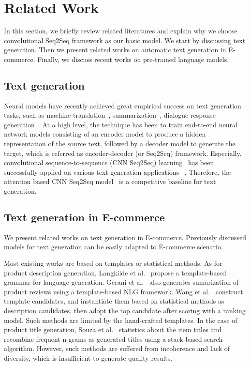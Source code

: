 \section{Related Work}
In this section, we briefly review related literatures
and explain why we choose convolutional Seq2Seq framework 
as our basic model.
We start by discussing text generation.
Then we present related works on automatic text generation in E-commerce.
Finally, we discuss recent works on
pre-trained language models.

\subsection{Text generation}
\label{sec:textgen}
Neural models have recently achieved great empirical success on text generation tasks,
such as machine translation~\cite{bahdanau2014neural,wu2016google},
summarization~\cite{chopra2016abstractive,nallapati2016abstractive},
dialogue response generation~\cite{serban2017multiresolution}.
At a high level, the technique has been to train end-to-end neural network models
consisting of an encoder model to produce a hidden representation of the source text, 
followed by a decoder model to generate the target, which is referred as 
encoder-decoder (or Seq2Seq) framework.
Especially, convolutional sequence-to-sequence (CNN Seq2Seq) learning~\cite{gehring2017convolutional}
has been successfully applied on various text generation applications
~\cite{wu2019pay,narayan2018don,baevski2018adaptive,dinan2018wizard}.
Therefore, the attention based CNN Seq2Seq model~\cite{ott2019fairseq} 
is a competitive baseline for text generation.

\subsection{Text generation in E-commerce}
We present related works on text generation in E-commerce.
Previously discussed models for text generation can be easily adapted to E-commerce scenario.

Most existing works are based on templates or statistical methods.
As for product description generation, 
Langkilde et al.~\cite{langkilde1998generation} propose a 
template-based grammar for language generation.
Gerani et al.~\cite{gerani2014abstractive} also generates sumarization of product reviews
using a template-based NLG framework.
Wang et al.~\cite{wang2017statistical} construct template candidates, and instantiate them  
based on statistical methods as description candidates,
then adopt the top candidate after scoring with a ranking model. 
Such methods are limited by the hand-crafted templates.
In the case of product title generation, 
Souza et al.~\cite{de2018generating} statistics about the item titles and
recombine frequent n-grams as generated titles using a stack-based search algorithm. 
However, such methods are suffered from incoherence and lack of diversity, 
which is insufficient to generate quality results.

